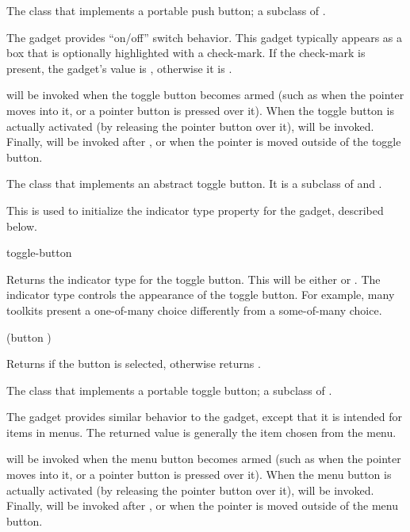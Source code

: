 
The class that implements a portable push button; a subclass of .



The  gadget provides ``on/off'' switch behavior.  This gadget
typically appears as a box that is optionally highlighted with a check-mark.  If
the check-mark is present, the gadget's value is , otherwise it is
.

 will be invoked when the toggle button becomes armed (such as
when the pointer moves into it, or a pointer button is pressed over it).  When
the toggle button is actually activated (by releasing the pointer button over
it),  will be invoked.  Finally, 
will be invoked after , or when the pointer is moved
outside of the toggle button.


The class that implements an abstract toggle button.  It is a subclass of
 and .


This is used to initialize the indicator type property for the gadget,
described below.

 {toggle-button}

Returns the indicator type for the toggle button.  This will be either
 or .  The indicator type controls the appearance of
the toggle button.  For example, many toolkits present a one-of-many choice
differently from a some-of-many choice.

 {(button )}

Returns  if the button is selected, otherwise returns .


The class that implements a portable toggle button; a subclass of .



The  gadget provides similar behavior to the 
gadget, except that it is intended for items in menus.  The returned value is
generally the item chosen from the menu.

 will be invoked when the menu button becomes armed (such as
when the pointer moves into it, or a pointer button is pressed over it).  When
the menu button is actually activated (by releasing the pointer button over
it),  will be invoked.  Finally, 
will be invoked after , or when the pointer is moved
outside of the menu button.

